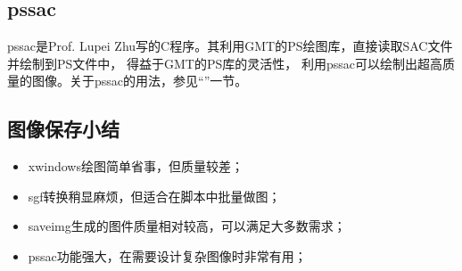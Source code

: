 \subsection{pssac}
pssac是Prof. Lupei Zhu写的C程序。其利用GMT的PS绘图库，直接读取SAC文件并绘制到PS文件中，
得益于GMT的PS库的灵活性，
利用pssac可以绘制出超高质量的图像。关于pssac的用法，参见``''一节。

\subsection{图像保存小结}
\begin{itemize}
\item xwindows绘图简单省事，但质量较差；
\item sgf转换稍显麻烦，但适合在脚本中批量做图；
\item saveimg生成的图件质量相对较高，可以满足大多数需求；
\item pssac功能强大，在需要设计复杂图像时非常有用；
\end{itemize}
